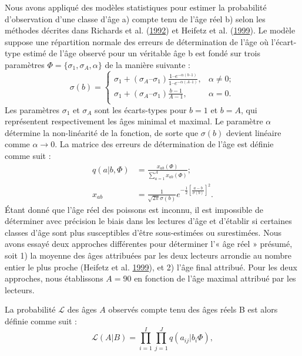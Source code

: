 \documentclass[11pt]{book}
\begin{document}
Nous avons appliqué des modèles statistiques pour estimer la probabilité d'observation d'une classe d'âge a) compte tenu de l'âge réel b) selon les méthodes décrites dans Richards et al. (\protect\hyperlink{ref-richards1992statistical}{1992}) et Heifetz et al. (\protect\hyperlink{ref-heifetz1999age}{1999}). Le modèle suppose une répartition normale des erreurs de détermination de l'âge où l'écart-type estimé de l'âge observé pour un véritable âge b est fondé sur trois paramètres \(\Phi = \{ \sigma_1, \sigma_A, \alpha \}\) de la manière suivante :
\begin{equation}
\sigma(b) = \left\{
 \begin{array}{ll}
  \sigma_1 + (\sigma_A – \sigma_1) \frac{1 – e^{-\alpha(b – 1)} }{1 – e^{-\alpha(A – 1)}}, & \alpha \neq 0; \\
  \sigma_1 + (\sigma_A – \sigma_1) \frac{b-1}{A-1}, & \alpha = 0.\\
 \end{array} \right.
\end{equation}
Les paramètres \(\sigma_1\) et \(\sigma_A\) sont les écarts-types pour \(b=1\) et \(b=A\), qui représentent respectivement les âges minimal et maximal. Le paramètre \(\alpha\) détermine la non-linéarité de la fonction, de sorte que \(\sigma(b)\) devient linéaire comme \(\alpha \rightarrow 0\). La matrice des erreurs de détermination de l'âge est définie comme suit :
\begin{align}
q(a \vert b, \Phi) &= \frac{x_{ab}(\Phi)}{\sum_{a = 1}^A x_{ab}(\Phi) }; \\x_{ab} &= \frac{1}{\sqrt{2\pi}\sigma(b)} e^{-\frac12 \left[ \frac{a-b}{\sigma(b)} \right]^2}.
\end{align}
Étant donné que l'âge réel des poissons est inconnu, il est impossible de déterminer avec précision le biais dans les lectures d'âge et d'établir si certaines classes d'âge sont plus susceptibles d'être sous-estimées ou surestimées. Nous avons essayé deux approches différentes pour déterminer l'« âge réel » présumé, soit 1) la moyenne des âges attribuées par les deux lecteurs arrondie au nombre entier le plus proche (Heifetz et al. \protect\hyperlink{ref-heifetz1999age}{1999}), et 2) l'âge final attribué. Pour les deux approches, nous établissons \(A=90\) en fonction de l'âge maximal attribué par les lecteurs.

La probabilité \(\mathcal{L}\) des âges \(A\) observés compte tenu des âges réels B est alors définie comme suit :
\begin{equation}
\mathcal{L}(A \vert B) = \prod_{i = 1}^I \prod_{j = 1}^J q(a_{ij} \vert b_i \Phi),\end{equation}
\end{document}
